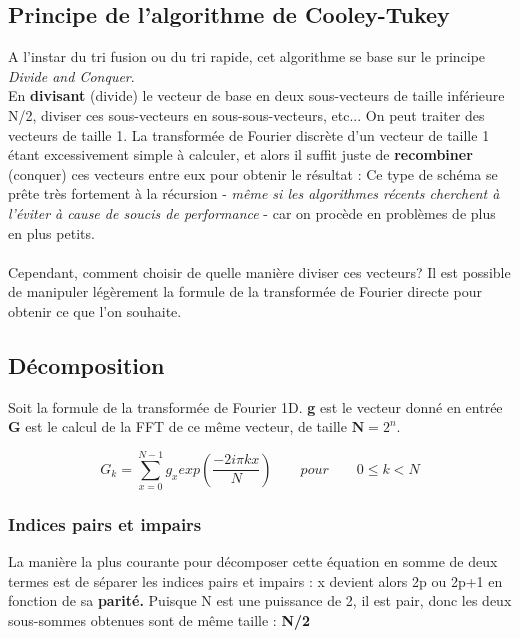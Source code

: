 \documentclass{article}
\begin{document}
\subsection{Principe de l'algorithme de Cooley-Tukey}

A l'instar du tri fusion ou du tri rapide, cet algorithme se base sur le principe \textit{Divide and Conquer}. \\
En \textbf{divisant} (divide) le vecteur de base en deux sous-vecteurs de taille inférieure N/2, diviser ces sous-vecteurs en sous-sous-vecteurs, etc... On peut traiter des vecteurs de taille 1. La transformée de Fourier discrète d'un vecteur de taille 1 étant excessivement simple à calculer, et alors il suffit juste de \textbf{recombiner} (conquer) ces vecteurs entre eux pour obtenir le résultat : Ce type de schéma se prête très fortement à la récursion - \textit{même si les algorithmes récents cherchent à l'éviter à cause de soucis de performance} - car on procède en problèmes de plus en plus petits.\\~\\
Cependant, comment choisir de quelle manière diviser ces vecteurs? Il est possible de manipuler légèrement la formule de la transformée de Fourier directe pour obtenir ce que l'on souhaite.

\subsection{Décomposition}

Soit la formule de la transformée de Fourier 1D. \textbf{g} est le vecteur donné en entrée \textbf{G} est le calcul de la FFT de ce même vecteur, de taille $\textbf{N} = 2^{n}$.

\begin{equation}
	G_{k} = \sum_{x = 0}^{N-1}g_{x} exp(\frac{-2i\pi kx}{N}) \qquad pour \qquad 0 \leq k < N
\end{equation}

\subsubsection{Indices pairs et impairs}

La manière la plus courante pour décomposer cette équation en somme de deux termes est de séparer les indices pairs et impairs : x devient alors 2p ou 2p+1 en fonction de sa \textbf{parité.} Puisque N est une puissance de 2, il est pair, donc les deux sous-sommes obtenues sont de même taille : \textbf{N/2}
\end{document}
